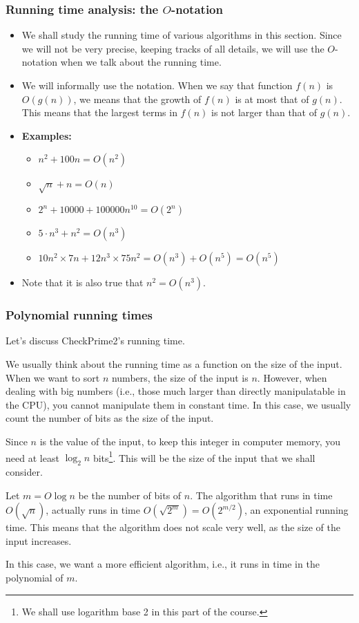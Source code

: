 \begin{frame}\frametitle{Running time analysis: the $O$-notation}
  \begin{itemize}                  
  \item We shall study the running time of various algorithms in this
    section.  Since we will not be very precise, keeping tracks of all
    details, we will use the $O$-notation when we talk about the
    running time.
  \item
    We will informally use the notation.  When we say that function
    $f(n)$ is $O(g(n))$, we means that the growth of $f(n)$ is at most
    that of $g(n)$.  This means that the largest terms in $f(n)$ is
    not larger than that of $g(n)$.
  \item
    {\bf Examples:}
    \begin{itemize}
    \item $n^2 + 100n = O(n^2)$
    \item $\sqrt{n} + n = O(n)$
    \item $2^n + 10000 + 100000n^{10} = O(2^n)$
    \item $5\cdot n^3 + n^2 = O(n^3)$
    \item $10n^2 \times 7n + 12n^3\times 75n^2  = O(n^3) + O(n^5) = O(n^5)$
    \end{itemize}
  \item Note that it is also true that $n^2 = O(n^3)$.
  \end{itemize}
\end{frame}

\begin{frame}\frametitle{Polynomial running times}
  Let's discuss CheckPrime2's running time.

  We usually think about the running time as a function on the size of
  the input.  When we want to sort $n$ numbers, the size of the input
  is $n$.  However, when dealing with big numbers (i.e., those much
  larger than directly manipulatable in the CPU), you cannot
  manipulate them in constant time.  In this case, we usually count
  the number of bits as the size of the input.

  Since $n$ is the value of the input, to keep this integer in
  computer memory, you need at least $\log_2 n$ bits\footnote{We shall
    use logarithm base 2 in this part of the course.}.  This will be
  the size of the input that we shall consider.

  \vspace{0.1in}
  Let $m=O\log n$ be the number of bits of $n$.  The algorithm that
  runs in time $O(\sqrt{n})$, actually runs in time
  $O(\sqrt{2^m})=O(2^{m/2})$, an exponential running time.  This means
  that the algorithm does not scale very well, as the size of the
  input increases.
  
  In this case, we want a more efficient algorithm, i.e., it runs in
  time in the polynomial of $m$.
\end{frame}

